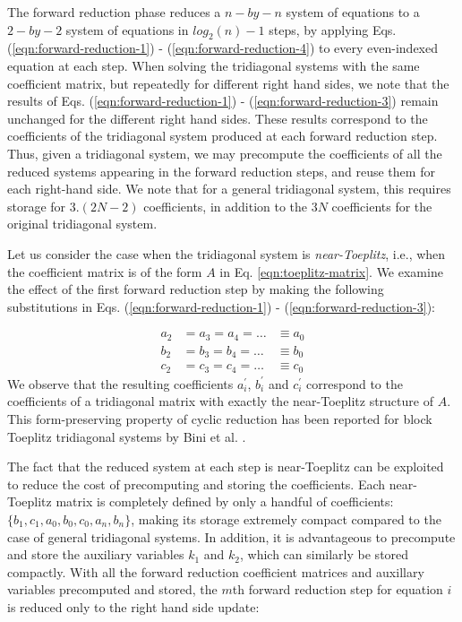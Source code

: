 The forward reduction phase reduces
a $n-by-n$ system of equations to a
$2-by-2$ system of equations in $log_2(n)-1$ steps,
by applying
Eqs. (\ref{eqn:forward-reduction-1}) -
(\ref{eqn:forward-reduction-4})
to every even-indexed equation at each step.
When solving the tridiagonal systems
with the same coefficient matrix,
but repeatedly for different right hand sides,
we note that the results of
Eqs. (\ref{eqn:forward-reduction-1}) -
(\ref{eqn:forward-reduction-3})
remain unchanged for the different right hand sides.
These results correspond to the
coefficients of the tridiagonal system
produced at each forward reduction step.
Thus, given a tridiagonal system,
we may precompute
the coefficients of all
the reduced systems appearing in the
forward reduction steps,
and reuse them for each right-hand side.
We note that for a general tridiagonal system,
this requires storage for $3.(2N - 2)$ coefficients,
in addition to the $3N$ coefficients
for the original tridiagonal system.

Let us consider the case
when the tridiagonal system is \emph{near-Toeplitz},
i.e., when the coefficient matrix is of the form
$A$ in Eq. \ref{eqn:toeplitz-matrix}.
We examine the effect of the
first forward reduction step by making the following substitutions
in Eqs. (\ref{eqn:forward-reduction-1}) -
(\ref{eqn:forward-reduction-3}):

\begin{align*}
    a_2 &= a_3 = a_4 = \hdots &\equiv a_0 \\
    b_2 &= b_3 = b_4 = \hdots &\equiv b_0 \\
    c_2 &= c_3 = c_4 = \hdots &\equiv c_0
\end{align*}
%
We observe that the resulting coefficients
$a_i^\prime$, $b_i^\prime$ and $c_i^\prime$
correspond to the coefficients of a tridiagonal matrix with
exactly the near-Toeplitz structure of $A$.
This form-preserving property of cyclic reduction
has been reported for block Toeplitz tridiagonal systems
by Bini et al. \cite{bini}.

The fact that the reduced system at each step
is near-Toeplitz can be exploited
to reduce the cost of
precomputing and storing the coefficients.
Each near-Toeplitz matrix is completely defined
by only a handful of coefficients:
$\{b_1, c_1, a_0, b_0, c_0, a_n, b_n\}$,
making its storage extremely compact
compared to the case of general tridiagonal systems.
In addition,
it is advantageous to precompute and store the
auxiliary variables $k_1$ and $k_2$,
which can similarly be stored compactly.
With all the forward reduction coefficient matrices
and auxillary variables precomputed and stored,
the $m$th forward reduction step for equation $i$
is reduced only to the right hand side update:

